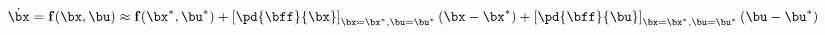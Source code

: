 \documentclass[preview]{standalone}
\begin{document}
\begin{center}
\begin{equation}\dot\bx = {\bf f}(\bx,\bu) \approx {\bf f}(\bx^*,\bu^*) + \left[ \pd{\bff}{\bx}\right]_{\bx=\bx^*,\bu=\bu^*} (\bx - \bx^*) + \left[ \pd{\bff}{\bu}\right]_{\bx=\bx^*,\bu=\bu^*} (\bu - \bu^*)\end{equation}
\end{center}
\end{document}
